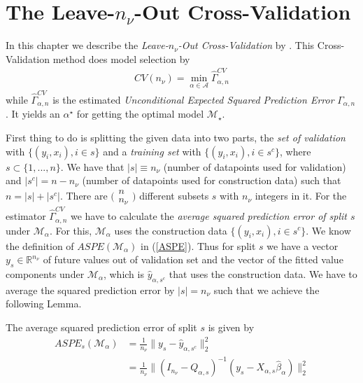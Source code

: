 \documentclass[Research_Module_ES.tex]{subfiles}
\begin{document}
\section{The Leave-$n_\nu$-Out Cross-Validation}
In this chapter we describe the \textit{Leave-$n_\nu$-Out Cross-Validation} by \cite{shao}. This Cross-Validation method does model selection by
\begin{align*}
CV(n_\nu)=\min_{\alpha\in\mathcal{A}}\hat{\Gamma}_{\alpha,n}^{CV}
\end{align*}
while $\hat{\Gamma}_{\alpha,n}^{CV}$ is the estimated \textit{Unconditional Expected Squared Prediction Error} $\Gamma_{\alpha,n}$. It yields an $\alpha^\star$ for getting the optimal model $\mathcal{M}_\star$.


First thing to do is splitting the given data into two parts, the \textit{set of validation} with $\{(y_i,x_i), i\in s\}$ and a \textit{training set} with $\{(y_i,x_i), i\in s^c\}$, where $s\subset\{1,...,n\}$. We have that $|s|\equiv n_\nu$ (number of datapoints used for validation) and $|s^c|=n-n_\nu$ (number of datapoints used for
construction data) such that $n=|s|+|s^c|$. There are 
$\Big(\begin{matrix}
	n\\n_\nu
\end{matrix}\Big)$ different subsets $s$ with $n_\nu$ integers in it. For the estimator $\hat{\Gamma}_{\alpha,n}^{CV}$ we have to calculate the \textit{average squared prediction error of split $s$} under $\mathcal{M}_\alpha$. For this,   $\mathcal{M}_\alpha$ uses the construction data $\{(y_i,x_i), i\in s^c\}$. We know the definition of $ASPE(\mathcal{M}_\alpha)$ in (\ref{ASPE}). Thus for split $s$ we have a vector $y_s\in\mathbb{R}^{n_\nu}$ of future values out of validation set and the vector of the fitted value components under $\mathcal{M}_\alpha$, which is $\hat{y}_{\alpha,s^c}$ that uses the construction data. We have to average the squared prediction error by $|s|=n_\nu$ such that we achieve the following Lemma.
\begin{lemma}
	\label{Equation3.1}
	The average squared prediction error of split $s$ is given by
	\begin{align*}
		ASPE_{s}(\mathcal{M}_\alpha)&=\frac{1}{n_\nu}\parallel y_s-\hat{y}_{\alpha,s^c}\parallel_2^2\\
		&=\frac{1}{n_\nu}\parallel (I_{n_\nu}-Q_{\alpha,s})^{-1}(y_s-X_{\alpha,s}\hat{\beta}_\alpha)\parallel_2^2
	\end{align*}
\end{lemma}
\end{document}
